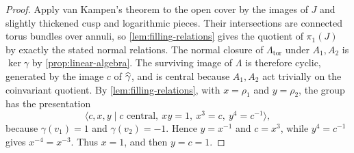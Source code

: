 \begin{proof}
Apply van Kampen's theorem to the open cover by the images of $J$ and
slightly thickened cusp and logarithmic pieces.  Their intersections are
connected torus bundles over annuli, so \cref{lem:filling-relations}
gives the quotient of $\pi_1(J)$ by exactly the stated normal relations.
The normal closure of $\Lambda_{\mathrm{tor}}$ under $A_1,A_2$ is
$\ker\gamma$ by \cref{prop:linear-algebra}.  The surviving image of
$\Lambda$ is therefore cyclic, generated by the image $c$ of
$\widehat\gamma$, and is central because $A_1,A_2$ act trivially on the
coinvariant quotient.  By \cref{lem:filling-relations}, with
$x=\rho_1$ and $y=\rho_2$, the group has the presentation
\[
 \langle c,x,y\mid c\text{ central},\ xy=1,\ x^3=c,\ y^4=c^{-1}\rangle,
\]
because $\gamma(v_1)=1$ and $\gamma(v_2)=-1$.  Hence $y=x^{-1}$ and
$c=x^3$, while $y^4=c^{-1}$ gives $x^{-4}=x^{-3}$.  Thus $x=1$, and then
$y=c=1$.
\end{proof}

